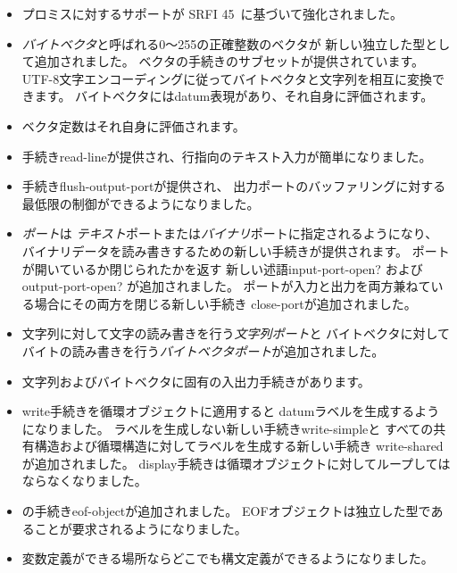 \begin{itemize}
\item プロミスに対するサポートが
SRFI 45~\cite{srfi45}に基づいて強化されました。

\item {\em バイトベクタ}と呼ばれる0〜255の正確整数のベクタが
新しい独立した型として追加されました。
ベクタの手続きのサブセットが提供されています。
UTF-8文字エンコーディングに従ってバイトベクタと文字列を相互に変換できます。
バイトベクタにはdatum表現があり、それ自身に評価されます。

\item ベクタ定数はそれ自身に評価されます。

\item 手続き{\cf read-line}が提供され、行指向のテキスト入力が簡単になりました。

\item 手続き{\cf flush-output-port}が提供され、
出力ポートのバッファリングに対する最低限の制御ができるようになりました。

\item {\em ポート}は
{\em テキスト}ポートまたは{\em バイナリ}ポートに指定されるようになり、
バイナリデータを読み書きするための新しい手続きが提供されます。
ポートが開いているか閉じられたかを返す
新しい述語{\cf input-port-open?} および{\cf output-port-open?} が追加されました。
ポートが入力と出力を両方兼ねている場合にその両方を閉じる新しい手続き
{\cf close-port}が追加されました。

\item 文字列に対して文字の読み書きを行う{\em 文字列ポート}と
バイトベクタに対してバイトの読み書きを行う{\em バイトベクタポート}が追加されました。

\item 文字列およびバイトベクタに固有の入出力手続きがあります。

\item {\cf write}手続きを循環オブジェクトに適用すると
datumラベルを生成するようになりました。
ラベルを生成しない新しい手続き{\cf write-simple}と
すべての共有構造および循環構造に対してラベルを生成する新しい手続き
{\cf write-shared}が追加されました。
{\cf display}手続きは循環オブジェクトに対してループしてはならなくなりました。

\item \rsixrs{}の手続き{\cf eof-object}が追加されました。
EOFオブジェクトは独立した型であることが要求されるようになりました。

\item 変数定義ができる場所ならどこでも構文定義ができるようになりました。


\end{itemize}

